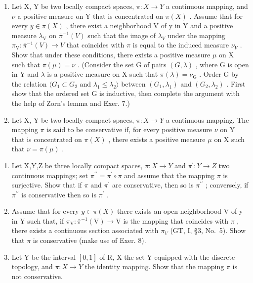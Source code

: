 \begin{enumerate}
\def\labelenumi{\arabic{enumi})}
\setcounter{enumi}{7}
\item
  Let X, Y be two locally compact spaces, \(\pi: X \to Y\) a continuous mapping, and \(\nu\) a positive measure on Y that is concentrated on \(\pi(X)\) . Assume that for every \(y \in \pi(X)\) , there exist a neighborhood V of y in Y and a positive measure \(\lambda_{\mathrm{V}}\) on \(\overline{\pi}^{-1}(V)\) such that the image of \(\lambda_{V}\) under the mapping \(\pi_{\mathrm{V}}: \overline{\pi}^{-1}(V) \to V\) that coincides with \(\pi\) is equal to the induced measure \(\nu_{V}\) . Show that under these conditions, there exists a positive measure \(\mu\) on X such that \(\pi(\mu) = \nu\) . (Consider the set G of pairs \((G, \lambda)\) , where G is open in Y and \(\lambda\) is a positive measure on X such that \(\pi(\lambda) = \nu_{\mathrm{G}}\) . Order G by the relation \(\langle G_{1} \subset G_{2} \text{ and } \lambda_{1} \leqslant \lambda_{2} \rangle\) between \((G_{1}, \lambda_{1})\) and \((G_{2}, \lambda_{2})\) . First show that the ordered set G is inductive, then complete the argument with the help of Zorn's lemma and Exer. 7.)
\item
  Let X, Y be two locally compact spaces, \(\pi: X \to Y\) a continuous mapping. The mapping \(\pi\) is said to be conservative if, for every positive measure \(\nu\) on Y that is concentrated on \(\pi(X)\) , there exists a positive measure \(\mu\) on X such that \(\nu = \pi(\mu)\) .
\end{enumerate}

\begin{enumerate}
\def\labelenumi{\alph{enumi})}
\item
  Let X,Y,Z be three locally compact spaces, \(\pi:X\to Y\) and \(\pi^{\prime}:Y\to Z\) two continuous mappings; set \(\pi^{\prime\prime}=\pi^{\prime}\circ\pi\) and assume that the mapping \(\pi\) is surjective. Show that if \(\pi\) and \(\pi^{\prime}\) are conservative, then so is \(\pi^{\prime\prime}\) ; conversely, if \(\pi^{\prime\prime}\) is conservative then so is \(\pi^{\prime}\) .
\item
  Assume that for every \(y \in \pi(X)\) there exists an open neighborhood V of y in Y such that, if \(\pi_{\mathrm{V}} : \overline{\pi}^{-1}(\mathrm{V}) \to \mathrm{V}\) is the mapping that coincides with \(\pi\) , there exists a continuous section associated with \(\pi_{V}\) (GT, I, §3, No.~5). Show that \(\pi\) is conservative (make use of Exer. 8).
\item
  Let Y be the interval \([0,1]\) of R, X the set Y equipped with the discrete topology, and \(\pi:X\to Y\) the identity mapping. Show that the mapping \(\pi\) is not conservative.
\end{enumerate}

